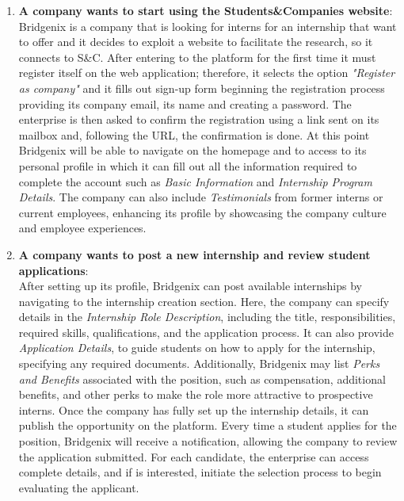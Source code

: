\begin{enumerate}
            \item \textbf{A company wants to start using the Students\&Companies website}:
            \\Bridgenix is a company that is looking for interns for an internship that want to offer and it decides to exploit a website to facilitate the research, so it connects to S\&C. After entering to the platform for the first time it must register itself on the web application; therefore, it selects the option \textit{"Register as company"} and it fills out sign-up form beginning the registration process providing its company email, its name and creating a password. The enterprise is then asked to confirm the registration using a link sent on its mailbox and, following the URL, the confirmation is done. At this point Bridgenix will be able to navigate on the homepage and to access to its personal profile in which it can fill out all the information required to complete the account such as \textit{Basic Information} and \textit{Internship Program Details}. The company can also include \textit{Testimonials} from former interns or current employees, enhancing its profile by showcasing the company culture and employee experiences.
            
            \item \textbf{A company wants to post a new internship and review student applications}:
            \\After setting up its profile, Bridgenix can post available internships by navigating to the internship creation section. Here, the company can specify details in the \textit{Internship Role Description}, including the title, responsibilities, required skills, qualifications, and the application process.
            It can also provide \textit{Application Details}, to guide students on how to apply for the internship, specifying any required documents. Additionally, Bridgenix may list \textit{Perks and Benefits} associated with the position, such as compensation, additional benefits, and other perks to make the role more attractive to prospective interns. Once the company has fully set up the internship details, it can publish the opportunity on the platform. 
            Every time a student applies for the position, Bridgenix will receive a notification, allowing the company to review the application submitted. For each candidate, the enterprise can access complete details, and if is interested, initiate the selection process to begin evaluating the applicant.
            

\end{enumerate}
